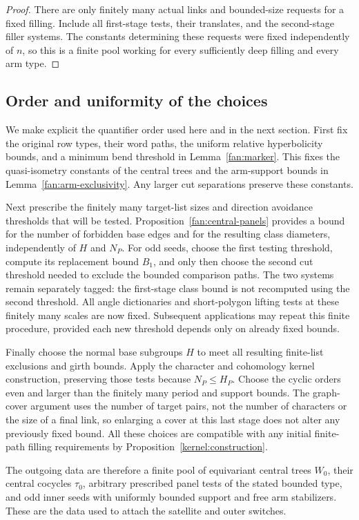 \begin{proof}
There are only finitely many actual links and bounded-size requests
for a fixed filling.  Include all first-stage tests, their translates,
and the second-stage filler systems.  The constants determining these
requests were fixed independently of $n$, so this is a finite pool
working for every sufficiently deep filling and every arm type.
\end{proof}

\subsection{Order and uniformity of the choices}\label{fan:scale-order}

We make explicit the quantifier order used here and in the next
section.  First fix the original row types, their word paths, the
uniform relative hyperbolicity bounds, and a minimum bend threshold
in Lemma~\ref{fan:marker}.  This fixes the quasi-isometry constants of
the central trees and the arm-support bounds in
Lemma~\ref{fan:arm-exclusivity}.  Any larger cut separations preserve
these constants.

Next prescribe the finitely many target-list sizes and direction
avoidance thresholds that will be tested.  Proposition~\ref{fan:central-panels}
provides a bound for the number of forbidden base edges and for the
resulting class diameters, independently of $H$ and $N_P$.  For odd
seeds, choose the first testing threshold, compute its replacement
bound $B_1$, and only then choose the second cut threshold needed to
exclude the bounded comparison paths.  The two systems remain
separately tagged: the first-stage class bound is not recomputed
using the second threshold.  All angle dictionaries and
short-polygon lifting tests at these finitely many scales are now
fixed.  Subsequent applications may repeat this finite procedure,
provided each new threshold depends only on already fixed bounds.

Finally choose the normal base subgroups $H$ to meet all resulting
finite-list exclusions and girth bounds.  Apply the character and
cohomology kernel construction, preserving those tests because
$N_P\le H_P$.  Choose the cyclic orders even and larger than the
finitely many period and support bounds.  The graph-cover argument
uses the number of target pairs, not the number of characters or the
size of a final link, so enlarging a cover at this last stage does not
alter any previously fixed bound.  All these choices are compatible
with any initial finite-path filling requirements by
Proposition~\ref{kernel:construction}.

The outgoing data are therefore a finite pool of equivariant central
trees $W_0$, their central cocycles $\tau_0$, arbitrary prescribed panel
tests of the stated bounded type, and odd inner seeds with uniformly
bounded support and free arm stabilizers.  These are the data used to
attach the satellite and outer switches.
